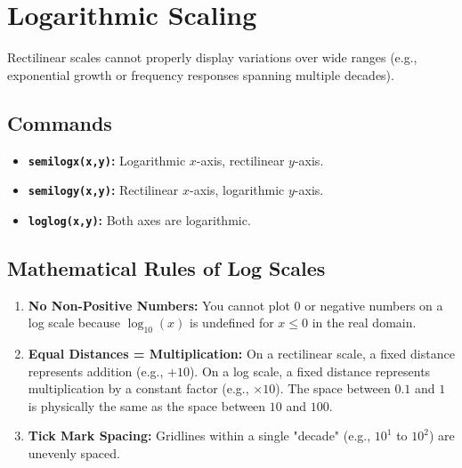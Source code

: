 \section{Logarithmic Scaling}
Rectilinear scales cannot properly display variations over wide ranges (e.g., exponential growth or frequency responses spanning multiple decades). 

\subsection{Commands}
\begin{itemize}
    \item \textbf{\texttt{semilogx(x,y)}:} Logarithmic $x$-axis, rectilinear $y$-axis.
    \item \textbf{\texttt{semilogy(x,y)}:} Rectilinear $x$-axis, logarithmic $y$-axis.
    \item \textbf{\texttt{loglog(x,y)}:} Both axes are logarithmic.
\end{itemize}

\subsection{Mathematical Rules of Log Scales}
\begin{enumerate}
    \item \textbf{No Non-Positive Numbers:} You cannot plot $0$ or negative numbers on a log scale because $\log_{10}(x)$ is undefined for $x \le 0$ in the real domain.
    \item \textbf{Equal Distances = Multiplication:} On a rectilinear scale, a fixed distance represents addition (e.g., $+10$). On a log scale, a fixed distance represents multiplication by a constant factor (e.g., $\times 10$). The space between $0.1$ and $1$ is physically the same as the space between $10$ and $100$.
    \item \textbf{Tick Mark Spacing:} Gridlines within a single "decade" (e.g., $10^1$ to $10^2$) are unevenly spaced. 
\end{enumerate}

